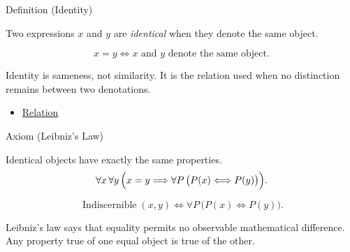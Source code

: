 \begin{definitionbox}{Definition (Identity)}
\begin{definition}[Identity]
\label{def:identity-relation}
Two expressions $x$ and $y$ are \emph{identical} when they denote the same
object.
\end{definition}

\begin{remark*}
\[
x=y \Longleftrightarrow x \text{ and } y \text{ denote the same object}.
\]
\end{remark*}

\begin{remark*}[Interpretation]
Identity is sameness, not similarity. It is the relation used when no
distinction remains between two denotations.
\end{remark*}

\begin{dependencies}
\begin{itemize}
  \item \hyperref[def:relation]{Relation}
\end{itemize}
\end{dependencies}
\end{definitionbox}

\begin{axiombox}{Axiom (Leibniz's Law)}
\begin{axiom}
\label{ax:leibniz-law}
Identical objects have exactly the same properties.
\[
\forall x\,\forall y\,
\Bigl(x=y \Longrightarrow \forall P\,\bigl(P(x)\Longleftrightarrow P(y)\bigr)\Bigr).
\]
\end{axiom}
\end{axiombox}

\begin{remark*}
\[
\operatorname{Indiscernible}(x,y)
\Longleftrightarrow
\forall P\,\bigl(P(x)\Longleftrightarrow P(y)\bigr).
\]
\end{remark*}

\begin{remark*}[Interpretation]
Leibniz's law says that equality permits no observable mathematical
difference. Any property true of one equal object is true of the other.
\end{remark*}

\NoLocalDependencies

